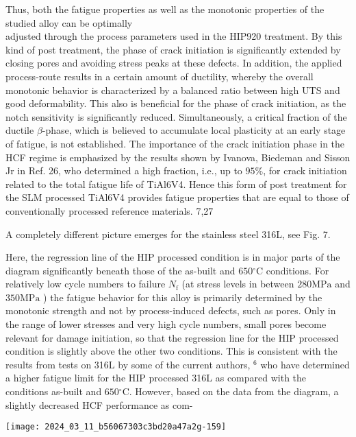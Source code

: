 \documentclass[10pt]{article}
\begin{document}
Thus, both the fatigue properties as well as the monotonic properties of the studied alloy can be optimally\\
adjusted through the process parameters used in the HIP920 treatment. By this kind of post treatment, the phase of crack initiation is significantly extended by closing pores and avoiding stress peaks at these defects. In addition, the applied process-route results in a certain amount of ductility, whereby the overall monotonic behavior is characterized by a balanced ratio between high UTS and good deformability. This also is beneficial for the phase of crack initiation, as the notch sensitivity is significantly reduced. Simultaneously, a critical fraction of the ductile $\beta$-phase, which is believed to accumulate local plasticity at an early stage of fatigue, is not established. The importance of the crack initiation phase in the HCF regime is emphasized by the results shown by Ivanova, Biedeman and Sisson Jr in Ref. 26, who determined a high fraction, i.e., up to $95 \%$, for crack initiation related to the total fatigue life of TiAl6V4. Hence this form of post treatment for the SLM processed TiAl6V4 provides fatigue properties that are equal to those of conventionally processed reference materials. 7,27

A completely different picture emerges for the stainless steel 316L, see Fig. 7.

Here, the regression line of the HIP processed condition is in major parts of the diagram significantly beneath those of the as-built and $650{ }^{\circ} \mathrm{C}$ conditions. For relatively low cycle numbers to failure $N_{\mathrm{f}}$ (at stress levels in between $280 \mathrm{MPa}$ and $350 \mathrm{MPa}$ ) the fatigue behavior for this alloy is primarily determined by the monotonic strength and not by process-induced defects, such as pores. Only in the range of lower stresses and very high cycle numbers, small pores become relevant for damage initiation, so that the regression line for the HIP processed condition is slightly above the other two conditions. This is consistent with the results from tests on 316L by some of the current authors, ${ }^{6}$ who have determined a higher fatigue limit for the HIP processed 316L as compared with the conditions as-built and $650{ }^{\circ} \mathrm{C}$. However, based on the data from the diagram, a slightly decreased HCF performance as com-

\begin{center}
\texttt{[image: 2024\_03\_11\_b56067303c3bd20a47a2g-159]}
\end{center}
\end{document}
